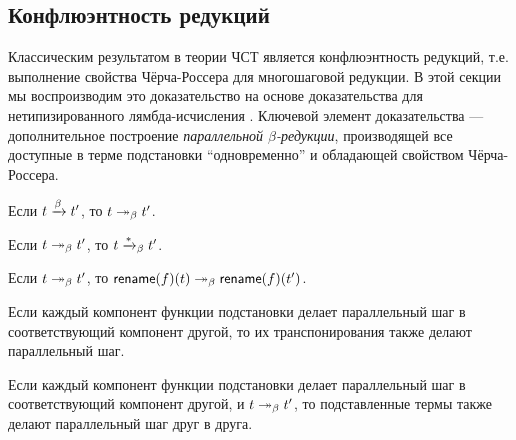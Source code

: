 \subsection{Конфлюэнтность редукций}

Классическим результатом в теории ЧСТ является
конфлюэнтность редукций, т.е. выполнение свойства
Чёрча-Россера для многошаговой редукции. В этой секции
мы воспроизводим это доказательство на основе
доказательства для нетипизированного лямбда-исчисления
\cite{CRproof}. Ключевой элемент доказательства ---
дополнительное построение \emph{параллельной
$\beta$-редукции}, производящей все доступные в терме
подстановки ``одновременно'' и обладающей свойством
Чёрча-Россера.

\begin{definition}
\end{definition}

\begin{lemma}
    Если $t \xrightarrow{\beta} t'$, то $t \twoheadrightarrow_{\beta} t'$.
\end{lemma}

\begin{lemma}
    Если $t \twoheadrightarrow_{\beta} t'$, то $t \xrightarrow{*}_{\beta} t'$.
\end{lemma}

\begin{lemma}
Если $t \twoheadrightarrow_{\beta} t'$, то
$\mathsf{rename}(f)(t) \twoheadrightarrow_{\beta} \mathsf{rename}(f)(t')$.
\end{lemma}

\begin{lemma}
Если каждый компонент функции подстановки делает
параллельный шаг в соответствующий компонент другой, то
их транспонирования также делают параллельный шаг.
\end{lemma}

\begin{lemma}
Если каждый компонент функции подстановки делает
параллельный шаг в соответствующий компонент другой, и
$t \twoheadrightarrow_{\beta} t'$, то подставленные термы также делают
параллельный шаг друг в друга.
\end{lemma}

